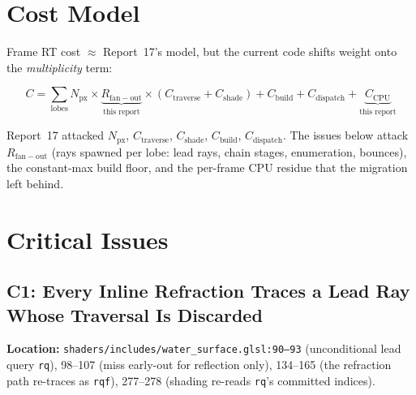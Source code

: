 \documentclass[11pt,a4paper]{article}
\begin{document}
\section{Cost Model}

Frame RT cost $\approx$ Report~17's model, but the current code shifts weight onto the \emph{multiplicity} term:

\begin{equation}
C = \sum_{\mathrm{lobes}} N_{\mathrm{px}} \times \underbrace{R_{\mathrm{fan-out}}}_{\text{this report}} \times (C_{\mathrm{traverse}} + C_{\mathrm{shade}}) + C_{\mathrm{build}} + C_{\mathrm{dispatch}} + \underbrace{C_{\mathrm{CPU}}}_{\text{this report}}
\end{equation}

Report~17 attacked $N_{\mathrm{px}}$, $C_{\mathrm{traverse}}$, $C_{\mathrm{shade}}$, $C_{\mathrm{build}}$, $C_{\mathrm{dispatch}}$. The issues below attack $R_{\mathrm{fan-out}}$ (rays spawned per lobe: lead rays, chain stages, enumeration, bounces), the constant-max build floor, and the per-frame CPU residue that the migration left behind.

\section{Critical Issues}

\subsection{C1: Every Inline Refraction Traces a Lead Ray Whose Traversal Is Discarded}

\textbf{Location:} \texttt{shaders/includes/water\_surface.glsl:90--93} (unconditional lead query \texttt{rq}), 98--107 (miss early-out for reflection only), 134--165 (the refraction path re-traces as \texttt{rqf}), 277--278 (shading re-reads \texttt{rq}'s committed indices).
\end{document}

